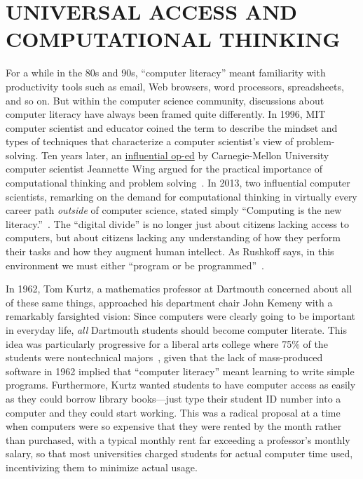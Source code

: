 
\section{UNIVERSAL ACCESS AND COMPUTATIONAL THINKING}




For a while in the 80s and 90s, ``computer literacy'' meant familiarity
with productivity tools such as email, Web browsers, word processors,
spreadsheets, and so on.
But within the computer science community, discussions about computer
literacy have always been framed quite differently.
In 1996, MIT computer scientist and educator  coined
the term  to describe the mindset and types of
techniques that characterize a computer scientist's view of
problem-solving.
Ten years later, an
\href{http://www.cs.cmu.edu/afs/cs/usr/wing/www/publications/Wing06.pdf}{influential
op-ed} by Carnegie-Mellon University computer scientist Jeannette Wing
argued for the practical importance of computational thinking and
problem solving~\cite{wing_computational_thinking}.
In 2013, two influential computer scientists, remarking on the demand
for computational thinking in virtually every career path \emph{outside}
of computer science,
stated simply
``Computing is the new
literacy.''~\cite{ieee_computer_special_issue_computing_education}.
The ``digital divide'' is no longer just about citizens lacking 
access to computers, but about citizens lacking any understanding of how
they perform 
their tasks and how they augment human intellect.  As Rushkoff says, in
this environment we must either ``program or be
programmed''~\cite{rushkoff}.

In 1962, Tom Kurtz, a mathematics professor at Dartmouth concerned
about all of these same things, approached
his department chair John Kemeny with a remarkably farsighted vision:
Since computers were clearly going to be important in everyday
life, \emph{all} Dartmouth students should become computer literate.  This idea
was
particularly progressive for a liberal arts college
where 75\% of the students were nontechnical majors~\cite{goto},
given that the lack of mass-produced software in 1962 implied that
``computer literacy'' meant learning to write simple programs.
Furthermore, Kurtz wanted students to have computer access as easily as
they could borrow library books---just type their student ID number into
a computer and they could start working.  This was a radical proposal at
a time when computers were so expensive that they were rented by the
month rather than purchased, with a typical monthly rent far
exceeding a professor's monthly salary, so that
most universities charged
students for actual 
computer time used,  incentivizing them to minimize actual
usage. 


